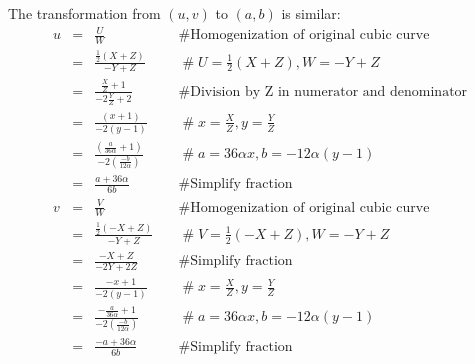 \documentclass{article}
\begin{document}
The transformation from $(u,v)$ to $(a,b)$ is similar:
\begin{equation*}
	\begin{array}{llll}
		u & = & \frac{U}{W} & \quad \mathrel{\#} \text{Homogenization of original cubic curve} \\
		& = & \frac{\frac{1}{2}(X + Z)}{-Y + Z} & \quad \mathrel{\#} U = \frac{1}{2}(X + Z), W = -Y + Z \\
		& = & \frac{\frac{X}{Z} + 1}{-2\frac{Y}{Z} + 2} & \quad \mathrel{\#} \text{Division by Z in numerator and denominator} \\
		& = & \frac{(x + 1)}{-2(y - 1)} & \quad \mathrel{\#} x = \frac{X}{Z}, y = \frac{Y}{Z} \\
		& = & \frac{(\frac{a}{36\alpha} + 1)}{-2\left(\frac{-b}{12\alpha} \right)} & \quad \mathrel{\#} a = 36 \alpha x, b = -12 \alpha (y-1) \\
		& = & \frac{a + 36\alpha}{6b} & \quad \mathrel{\#} \text{Simplify fraction} \\
		v & = & \frac{V}{W} & \quad \mathrel{\#} \text{Homogenization of original cubic curve} \\
		& = & \frac{\frac{1}{2}(-X + Z)}{-Y + Z} & \quad \mathrel{\#} V = \frac{1}{2}(-X + Z), W = -Y + Z \\
		& = & \frac{-X + Z}{-2Y + 2Z} & \quad \mathrel{\#} \text{Simplify fraction} \\
		& = & \frac{-x + 1}{-2(y -1)} & \quad \mathrel{\#} x = \frac{X}{Z}, y = \frac{Y}{Z} \\
		& = & \frac{-\frac{a}{36\alpha} + 1}{-2(\frac{-b}{12\alpha})} & \quad \mathrel{\#} a = 36 \alpha x, b = -12 \alpha (y-1) \\
		& = & \frac{-a + 36\alpha}{6b} & \quad \mathrel{\#} \text{Simplify fraction} 
	\end{array}
\end{equation*}
\end{document}
